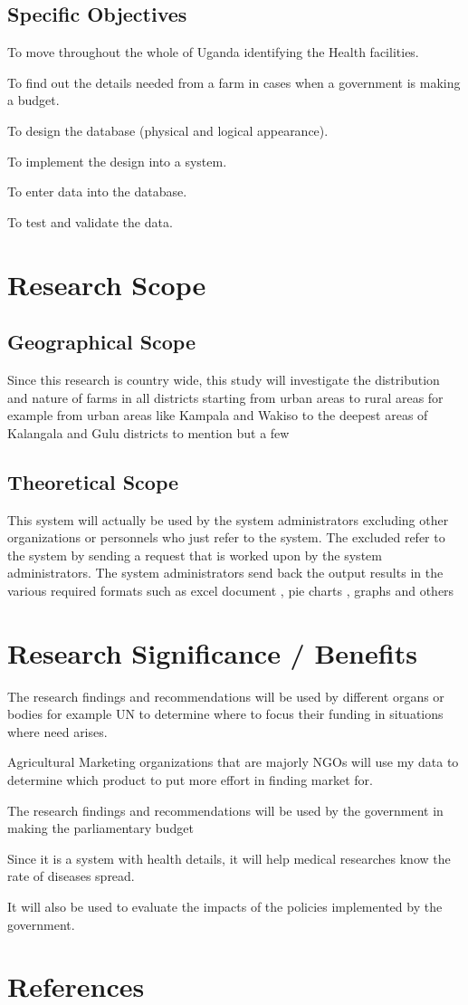\documentclass{article}
\begin{document}
\subsection{Specific Objectives}

To move throughout the whole of Uganda identifying the Health facilities.

To find out the details needed from a farm in cases when a government is making a budget.

To design the database (physical and logical appearance).

To implement the design into a system.

To enter data into the database.

To test and validate the data.


\section{Research Scope}
\subsection{Geographical Scope}
	Since this research is country wide, this study will investigate the distribution and nature of farms in all districts starting from urban areas to rural areas for example from urban areas like Kampala and Wakiso to the deepest areas of Kalangala and Gulu districts to mention but a few 
\subsection{Theoretical Scope}
This system will actually be used by the system administrators excluding other organizations or personnels who just refer to the system. The excluded refer to the system by sending a request that is worked upon by the system administrators. The system administrators send back the output results in the various required formats such as excel document , pie charts , graphs and others
\section{Research Significance / Benefits}

The research findings and recommendations will be used by different organs or bodies for example UN to determine where to focus their funding in situations where need arises.

Agricultural Marketing organizations that are majorly NGOs will use my data to determine which product to put more effort in finding market for.

The research findings and recommendations will be used by the government in making the parliamentary budget 

Since it is a system with health details, it will help medical researches know the rate of diseases spread.

It will also be used to evaluate the impacts of the policies implemented by the government.


\section{References}
\end{document}
